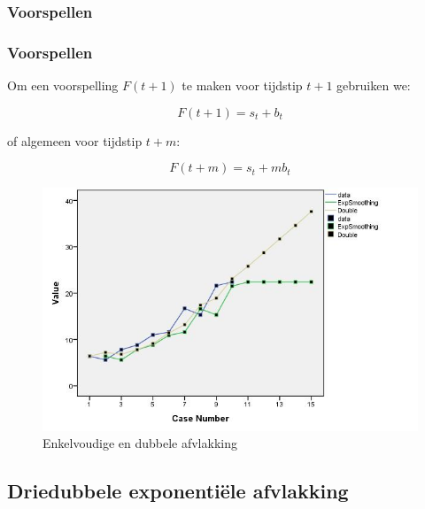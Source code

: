 \documentclass[aspectratio=169]{beamer}
\begin{document}
\subsubsection{Voorspellen}

\begin{frame}
  \frametitle{Voorspellen}

  Om een voorspelling $F(t+1)$ te maken voor tijdstip $t+1$ gebruiken we:

  \[ F(t+1) = s_t + b_t \]

  of algemeen voor tijdstip $t+m$:

  \[ F(t+m) = s_t + m b_t \]
\end{frame}

\begin{frame}
  \begin{figure}
    \centering
    \includegraphics[width=\textwidth]{img/tijdreeks71}
    \caption{Enkelvoudige en dubbele afvlakking}
    \label{fig:tijdreeks71}
  \end{figure}
\end{frame}

\subsection{Driedubbele exponentiële afvlakking}
\end{document}
